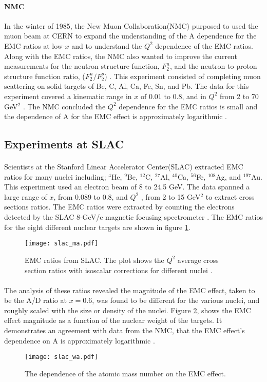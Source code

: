 \paragraph{NMC}In the winter of 1985, the New Muon Collaboration(NMC) purposed to used the muon beam at CERN to expand the understanding of the A dependence for the EMC ratios at low-$x$ and to understand the $Q^2$ dependence of the EMC ratios. Along with the EMC ratios, the NMC also wanted to improve the current measurements for the neutron structure function, $F_2^n$, and the neutron to proton structure function ratio, ($F_2^n/F_2^p$) \cite{NMCtech}. This experiment consisted of completing muon scattering on solid targets of Be, C, Al, Ca, Fe, Sn, and Pb. The data for this experiment covered a kinematic range in $x$ of 0.01 to 0.8, and in $Q^2$ from 2 to 70 GeV$^2$ \cite{ref:NMC}. The NMC concluded the $Q^2$ dependence for the EMC ratios is small and the dependence of A for the EMC effect is approximately logarithmic \cite{ref:NMC,Ajth}. 

\subsection{Experiments at SLAC}
\paragraph{}Scientists at the Stanford Linear Accelerator Center(SLAC) extracted EMC ratios for many nuclei including; $^4$He, $^9$Be, $^{12}$C, $^{27}$Al, $^{40}$Ca, $^{56}$Fe, $^{108}$Ag, and $^{197}$Au. This experiment used an electron beam of 8 to 24.5 GeV. The data spanned a large range of $x$, from 0.089 to 0.8, and $Q^2$ , from 2 to 15 GeV$^2$ to extract cross sections ratios. The EMC ratios were extracted by counting the electrons detected by the SLAC 8-GeV/c magnetic focusing spectrometer \cite{gomez}. The EMC ratios for the eight different nuclear targets are shown in figure \ref{gomez_ma}.
\begin{figure}[]
	\centering
		\texttt{[image: slac\_ma.pdf]} 
		\caption{EMC ratios from SLAC. The plot shows the $Q^2$ average cross section ratios with isoscalar corrections for different nuclei \cite{gomez}.}
		\label{gomez_ma}
\end{figure} 
\paragraph{} The analysis of these ratios revealed the magnitude of the EMC effect, taken to be the A/D ratio at $x=0.6$, was found to be different for the various nuclei, and roughly scaled with the size or density of the nuclei. Figure \ref{gomez_wa}, shows the EMC effect magnitude as a function of the nuclear weight of the targets. It demonstrates an agreement with data from the NMC, that the EMC effect's dependence on A is approximately logarithmic \cite{Ajth,gomez,seelyth}. 
\begin{figure}[t]
	\centering
	\texttt{[image: slac\_wa.pdf]} 
	\caption{The dependence of the atomic mass number on the EMC effect\cite{gomez}.}
	\label{gomez_wa}
\end{figure} 

